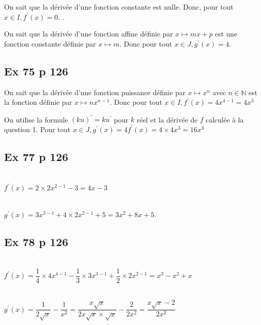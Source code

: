 \documentclass[12pt,a5paper]{book}
\begin{document}
\begin{enumMet}
    \item On sait que la dérivée d'une fonction constante est nulle. Donc, pour tout $x \in I, f^{\prime}(x)=0$. .
    \item On sait que la dérivée d'une fonction affine définie par $x \mapsto m x+p$ est une fonction constante définie par $x \mapsto m$. Donc pour tout $x \in J, g^{\prime}(x)=4$.
\end{enumMet}

\subsection*{Ex 75 p 126}

\begin{enumMet}
    \item On sait que la dérivée d'une fonction puissance définie par $x \mapsto x^{n}$ avec $n \in \mathbb{N}$ est la fonction définie par $x \mapsto n x^{n-1}$. Donc pour tout $x \in I, f^{\prime}(x)=4 x^{4-1}=4 x^{3}$
    \item On utilise la formule $(k u)^{\prime}=k u^{\prime}$ pour $k$ réel et la dérivée de $f$ calculée à la question 1. Pour tout $x \in J, g^{\prime}(x)=4 f^{\prime}(x)=4 \times 4 x^{3}=16 x^{3}$
\end{enumMet}

\subsection*{Ex 77 p 126}
\begin{enumMet}
    \item {}\\
    $f^{\prime}(x)=2 \times 2 x^{2-1}-3=4 x-3$
    \item {}\\
    $g^{\prime}(x)=3 x^{3-1}+4 \times 2 x^{2-1}+5=3 x^{2}+8 x+5$.
\end{enumMet}

\subsection*{Ex 78 p 126}
\begin{enumMet}
    \item {}\\
    $f^{\prime}(x)=\dfrac{1}{4} \times 4 x^{4-1}-\dfrac{1}{3} \times 3 x^{3-1}+\dfrac{1}{2} \times 2 x^{2-1}=x^{3}-x^{2}+x$
    \item {}\\
    $g^{\prime}(x)=\dfrac{1}{2 \sqrt{x}}-\dfrac{1}{x^{2}}=\dfrac{x \sqrt{x}}{2 x \sqrt{x} \times \sqrt{x}}-\dfrac{2}{2 x^{2}}=\dfrac{x \sqrt{x}-2}{2 x^{2}}$
\end{enumMet}
\end{document}
